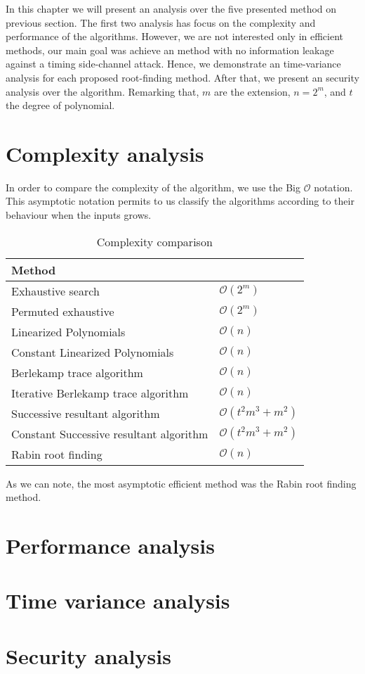 In this chapter we will present an analysis over the five presented method on previous section. The first two analysis has focus on the complexity and performance of the algorithms. However, we are not interested only in efficient methods, our main goal was achieve an method with no information leakage against a timing side-channel attack. Hence, we demonstrate an time-variance analysis for each proposed root-finding method. After that, we present an security analysis over the algorithm. Remarking that, $m$ are the extension, $n = 2^m$, and $t$ the degree of polynomial.

\section{Complexity analysis}
In order to compare the complexity of the algorithm, we use the Big $\mathcal{O}$ notation. This asymptotic notation permits to us classify the algorithms according to their behaviour when the inputs grows. 




\begin{table}[ht]
\centering
\label{tab:complexity}
\caption{Complexity comparison}
\begin{tabular}{ll}
Method                                  &                \\ \hline
Exhaustive search                       & $\mathcal{O}(2^m)$ \\
Permuted exhaustive                     & $\mathcal{O}(2^m)$ \\
Linearized Polynomials                  & $\mathcal{O}(n)$ \\
Constant Linearized Polynomials         & $\mathcal{O}(n)$ \\
Berlekamp trace algorithm               & $\mathcal{O}(n)$ \\
Iterative Berlekamp trace algorithm     & $\mathcal{O}(n)$ \\
Successive resultant algorithm          & $\mathcal{O}(t^2m^3 + m^2)$ \\
Constant Successive resultant algorithm & $\mathcal{O}(t^2m^3 + m^2)$ \\
Rabin root finding                      & $\mathcal{O}(n)$
\end{tabular}
\end{table}

As we can note, the most asymptotic efficient method was the Rabin root finding method.

\section{Performance analysis}
\section{Time variance analysis}
\section{Security analysis}